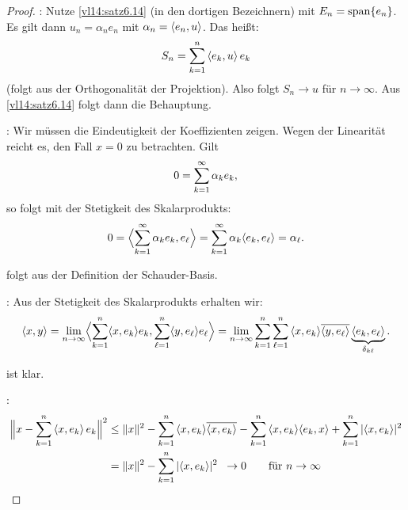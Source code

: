 \begin{proof}
    : Nutze \cref{vl14:satz6.14} (in den dortigen
    Bezeichnern) mit  $E_n=\operatorname{span}\{e_n\}$. Es gilt dann $u_n = \alpha_n e_n$ mit
    $\alpha_n = \SP{e_n,u}$. Das heißt: \[ S_n = \ksum^n \, \SP{e_k,u} \, e_k
    \] (folgt aus der Orthogonalität der Projektion). Also folgt $S_n\to u$ für
    $n\to\infty$. Aus \ref{vl14:satz6.14} folgt dann die Behauptung.
    
    : Wir müssen die Eindeutigkeit der Koeffizienten zeigen.
    Wegen der Linearität reicht es, den Fall $x=0$ zu betrachten. Gilt 
    \[ 0 = \sum_{k=1}^\infty \alpha_k e_k  , \]
    so folgt mit der Stetigkeit des Skalarprodukts:
    \[ 0 = \SPa[\Big]{ \ksum^\infty \alpha_k e_k, e_\ell }
         = \ksum^\infty \alpha_k \SP{e_k,e_\ell} = \alpha_\ell
    . \]
    
     folgt aus der Definition der Schauder-Basis.
    
    : Aus der Stetigkeit des Skalarprodukts erhalten wir:
    \[ \SP{x,y} = \lim_{n\to\infty} \SPa[\Big]{ \ksum^n \SP{x,e_k} e_k,
        \sum_{\ell=1}^n \SP{y,e_\ell} e_\ell }
        = \lim_{n\to\infty} \sum_{k=1}^n \sum_{\ell=1}^n 
            \, \SP{x,e_k} \ol{\SP{y,e_\ell}}
            \underbrace{\SP{e_k,e_\ell}}_{\kron{k\ell}}
    . \]
    
     ist klar.
    
    :
    \begin{align*}
        \norm[\Big]{ x - \ksum^n \, \SP{x,e_k} \, e_k  }^2 
        &\leq \norm{x}^2 - \ksum^n  \,\SP{x,e_k} \ol{\SP{x,e_k}}
        - \ksum^n \, \SP{x,e_k} \SP{e_k,x} + \ksum^n \, \abs{\SP{x,e_k}}^2
        \\
        &= \norm{x}^2 - \ksum^n \, \abs{\SP{x,e_k}}^2 
        \;\; \to 0 \fuer n\to\infty
    \end{align*}
\end{proof}
